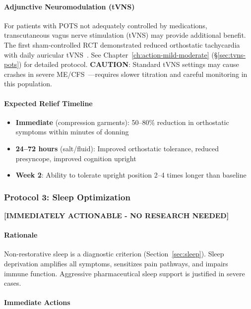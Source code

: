 \paragraph{Adjunctive Neuromodulation (tVNS)}
For patients with POTS not adequately controlled by medications, transcutaneous vagus nerve stimulation (tVNS) may provide additional benefit. The first sham-controlled RCT demonstrated reduced orthostatic tachycardia with daily auricular tVNS~\cite{Teixeira2024POTS}. See Chapter~\ref{ch:action-mild-moderate} (\S\ref{sec:tvns-pots}) for detailed protocol. \textbf{CAUTION}: Standard tVNS settings may cause crashes in severe ME/CFS~\cite{Lugg2024MECFS}---requires slower titration and careful monitoring in this population.

\paragraph{Expected Relief Timeline}
\begin{itemize}
    \item \textbf{Immediate} (compression garments): 50--80\% reduction in orthostatic symptoms within minutes of donning
    \item \textbf{24--72 hours} (salt/fluid): Improved orthostatic tolerance, reduced presyncope, improved cognition upright
    \item \textbf{Week 2}: Ability to tolerate upright position 2--4 times longer than baseline
\end{itemize}

\subsubsection{Protocol 3: Sleep Optimization}

\textbf{[IMMEDIATELY ACTIONABLE - NO RESEARCH NEEDED]}

\paragraph{Rationale}
Non-restorative sleep is a diagnostic criterion (Section~\ref{sec:sleep}). Sleep deprivation amplifies all symptoms, sensitizes pain pathways, and impairs immune function. Aggressive pharmaceutical sleep support is justified in severe cases.

\paragraph{Immediate Actions}

